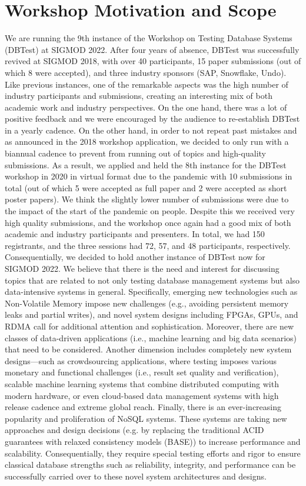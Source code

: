 \documentclass[sigconf]{acmart}
\begin{document}
\section{Workshop Motivation and Scope}
We are running the 9th instance of the Workshop on Testing Database Systems (DBTest) at SIGMOD 2022.
After four years of absence, DBTest was successfully revived at SIGMOD 2018, with over 40 participants, 15 paper submissions (out of which 8 were accepted), and three industry sponsors (SAP, Snowflake, Undo).
Like previous instances, one of the remarkable aspects was the high number of industry participants and submissions, creating an interesting mix of both academic work and industry perspectives.
On the one hand, there was a lot of positive feedback and we were encouraged by the audience to re-establish DBTest in a yearly cadence.
On the other hand, in order to not repeat past mistakes and as announced in the 2018 workshop application, we decided to only run with a biannual cadence to prevent from running out of topics and high-quality submissions.
As a result, we applied and held the 8th instance for the DBTest workshop in 2020 in virtual format due to the pandemic with 10 submissions in total (out of which 5 were accepted as full paper and 2 were accepted as short poster papers).
We think the slightly lower number of submissions were due to the impact of the start of the pandemic on people.
Despite this we received very high quality submissions, and the workshop once again had a good mix of both academic and industry participants and presenters. In total, we had 150 registrants, and the three sessions had 72, 57, and 48 participants, respectively.
Consequentially, we decided to hold another instance of DBTest now for SIGMOD 2022.
We believe that there is the need and interest for discussing topics that are related to not only testing database management systems but also data-intensive systems in general.
Specifically, emerging new technologies such as Non-Volatile Memory impose new challenges (e.g., avoiding persistent memory leaks and partial writes), and novel system designs including FPGAs, GPUs, and RDMA call for additional attention and sophistication.
Moreover, there are new classes of data-driven applications (i.e., machine learning and big data scenarios) that need to be considered.
Another dimension includes completely new system designs---such as crowdsourcing applications, where testing imposes various monetary and functional challenges (i.e., result set quality and verification), scalable machine learning systems that combine distributed computing with modern hardware, or even cloud-based data management systems with high release cadence and extreme global reach.
Finally, there is an ever-increasing popularity and proliferation of NoSQL systems.
These systems are taking new approaches and design decisions (e.g. by replacing the traditional ACID guarantees with relaxed consistency models (BASE)) to increase performance and scalability.
Consequentially, they require special testing efforts and rigor to ensure classical database strengths such as reliability, integrity, and performance can be successfully carried over to these novel system architectures and designs.
\end{document}
